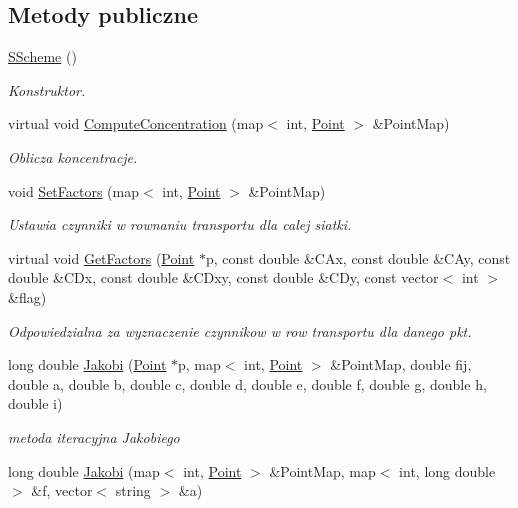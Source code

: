\subsection*{Metody publiczne}
\begin{DoxyCompactItemize}
\item 
\hyperlink{class_s_scheme_a007f3a5b981419391f6a57222f7d7da6}{S\+Scheme} ()
\begin{DoxyCompactList}\small\item\em Konstruktor. \end{DoxyCompactList}\item 
virtual void \hyperlink{class_s_scheme_a1607f2363ea074bde9ad9c585b5a4019}{Compute\+Concentration} (map$<$ int, \hyperlink{class_point}{Point} $>$ \&Point\+Map)
\begin{DoxyCompactList}\small\item\em Oblicza koncentracje. \end{DoxyCompactList}\item 
void \hyperlink{class_s_scheme_a9f9da388c80058c59123ea58e28f6408}{Set\+Factors} (map$<$ int, \hyperlink{class_point}{Point} $>$ \&Point\+Map)
\begin{DoxyCompactList}\small\item\em Ustawia czynniki w rownaniu transportu dla calej siatki. \end{DoxyCompactList}\item 
virtual void \hyperlink{class_s_scheme_ae1e554b35ec2d8a902f6fdb30d95ab20}{Get\+Factors} (\hyperlink{class_point}{Point} $\ast$p, const double \&C\+Ax, const double \&C\+Ay, const double \&C\+Dx, const double \&C\+Dxy, const double \&C\+Dy, const vector$<$ int $>$ \&flag)
\begin{DoxyCompactList}\small\item\em Odpowiedzialna za wyznaczenie czynnikow w row transportu dla danego pkt. \end{DoxyCompactList}\item 
long double \hyperlink{class_s_scheme_a1b66164d72e54d4b85322fa68f307c30}{Jakobi} (\hyperlink{class_point}{Point} $\ast$p, map$<$ int, \hyperlink{class_point}{Point} $>$ \&Point\+Map, double fij, double a, double b, double c, double d, double e, double f, double g, double h, double i)
\begin{DoxyCompactList}\small\item\em metoda iteracyjna Jakobiego \end{DoxyCompactList}\item 
long double \hyperlink{class_s_scheme_a78c4706ab3f69423302451983ad44022}{Jakobi} (map$<$ int, \hyperlink{class_point}{Point} $>$ \&Point\+Map, map$<$ int, long double $>$ \&f, vector$<$ string $>$ \&a)

\end{DoxyCompactItemize}
